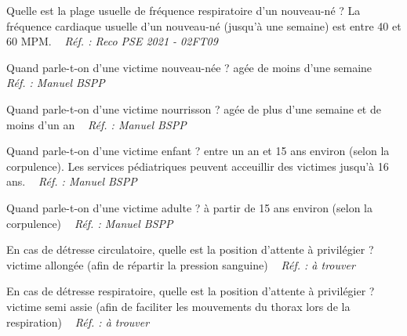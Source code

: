 \documentclass[grid,avery5371,landscape]{flashcards}
\makeatletter
\newcounter{nocarte}
\newcommand{\categ}[1]{%
  \def\@categ{#1}%
  \setcounter{nocarte}{0}%
}
\newcommand{\source}[1]{%
  \medskip
  \itshape%
   ~ \hfill Réf. : #1}
\makeatother
\begin{document}
\color[HTML]{003273}
\categ{PSE}
\begin{flashcard}[bilan]{
 Quelle est la plage usuelle de fréquence respiratoire d'un nouveau-né ?   }
  La fréquence cardiaque usuelle d'un nouveau-né (jusqu'à une semaine) est entre 40 et 60 MPM.
  \source{Reco PSE 2021 - 02FT09}
\end{flashcard}


\color[HTML]{003273}
\categ{PSE}
\begin{flashcard}[bilan]{
 Quand parle-t-on d'une victime nouveau-née ?   }
  agée de moins d'une semaine
  \source{Manuel BSPP}
\end{flashcard}


\color[HTML]{003273}
\categ{PSE}
\begin{flashcard}[bilan]{
 Quand parle-t-on d'une victime nourrisson ?   }
  agée de plus d'une semaine et de moins d'un an
  \source{Manuel BSPP}
\end{flashcard}


\color[HTML]{003273}
\categ{PSE}
\begin{flashcard}[bilan]{
 Quand parle-t-on d'une victime enfant ?   }
  entre un an et 15 ans environ (selon la corpulence). Les services pédiatriques peuvent acceuillir des victimes jusqu'à 16 ans.
  \source{Manuel BSPP}
\end{flashcard}


\color[HTML]{003273}
\categ{PSE}
\begin{flashcard}[bilan]{
 Quand parle-t-on d'une victime adulte ?   }
  à partir de 15 ans environ (selon la corpulence)
  \source{Manuel BSPP}
\end{flashcard}


\color[HTML]{003273}
\categ{PSE}
\begin{flashcard}[CAT]{
 En cas de détresse circulatoire, quelle est la position d'attente à privilégier ?   }
  victime allongée (afin de répartir la pression sanguine)
  \source{à trouver}
\end{flashcard}


\color[HTML]{003273}
\categ{PSE}
\begin{flashcard}[CAT]{
 En cas de détresse respiratoire, quelle est la position d'attente à privilégier ?   }
  victime semi assie (afin de faciliter les mouvements du thorax lors de la respiration)
  \source{à trouver}
\end{flashcard}
\end{document}
